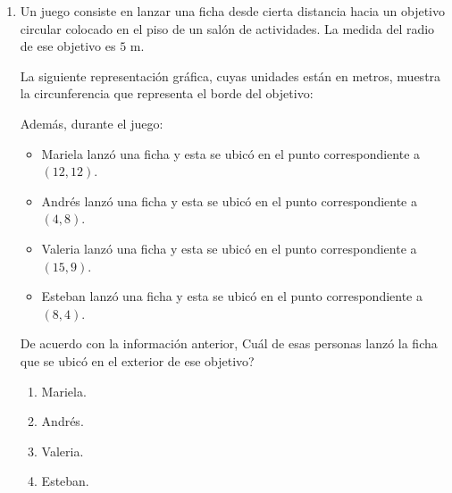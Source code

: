 \documentclass[12pt]{article}
\newcommand{\puntografico}{0.35}
\newcommand{\rotuloxeste}{\mbox{\textit{x} (este)}}
\newcommand{\rotuloynorte}{\mbox{\textit{y} (norte)}}
\begin{document}
\begin{enumerate}[label=\textbf{\arabic*.}, itemsep=2.5cm]
\Needspace{0.96\textheight}
\item
Un juego consiste en lanzar una ficha desde cierta distancia hacia un objetivo circular colocado en el piso de un sal\'on de actividades. La medida del radio de ese objetivo es $5$ m.

La siguiente representaci\'on gr\'afica, cuyas unidades est\'an en metros, muestra la circunferencia que representa el borde del objetivo:

\begin{center}
\end{center}

Adem\'as, durante el juego:

\begin{itemize}
  \item Mariela lanz\'o una ficha y esta se ubic\'o en el punto correspondiente a $(12,12)$.
  \item Andr\'es lanz\'o una ficha y esta se ubic\'o en el punto correspondiente a $(4,8)$.
  \item Valeria lanz\'o una ficha y esta se ubic\'o en el punto correspondiente a $(15,9)$.
  \item Esteban lanz\'o una ficha y esta se ubic\'o en el punto correspondiente a $(8,4)$.
\end{itemize}

De acuerdo con la informaci\'on anterior, \textquestiondown Cu\'al de esas personas lanz\'o la ficha que se ubic\'o en el exterior de ese objetivo?

\begin{enumerate}[label=\Alph*)]
  \item Mariela.
  \item Andr\'es.
  \item Valeria.
  \item Esteban.
\end{enumerate}


\end{enumerate}
\end{document}
